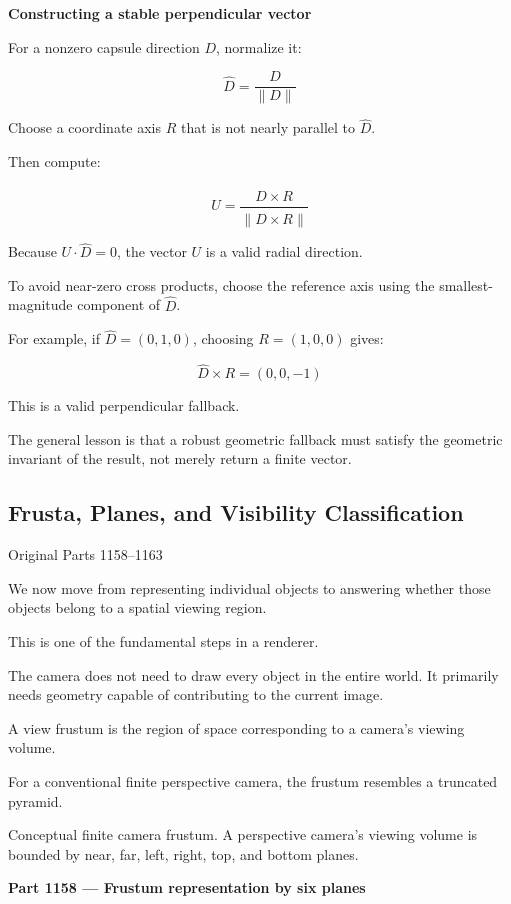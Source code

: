 \textbf{Constructing a stable perpendicular vector}

For a nonzero capsule direction \(D\), normalize it:

\[
\hat D=\frac{D}{\|D\|}
\]

Choose a coordinate axis \(R\) that is not nearly parallel to \(\hat D\).

Then compute:

\[
U=\frac{\hat D\times R}{\|\hat D\times R\|}
\]

Because \(U\cdot\hat D=0\), the vector \(U\) is a valid radial direction.

To avoid near-zero cross products, choose the reference axis using the smallest-magnitude component of \(\hat D\).

For example, if \(\hat D=(0,1,0)\), choosing \(R=(1,0,0)\) gives:

\[
\hat D\times R=(0,0,-1)
\]

This is a valid perpendicular fallback.

The general lesson is that a robust geometric fallback must satisfy the geometric invariant of the result, not merely return a finite vector.

\subsection{Frusta, Planes, and Visibility Classification}\label{03-visual-computing-i-ch021-frusta-planes-and-visibility-classification}

Original Parts 1158--1163

We now move from representing individual objects to answering whether those objects belong to a spatial viewing region.

This is one of the fundamental steps in a renderer.

The camera does not need to draw every object in the entire world. It primarily needs geometry capable of contributing to the current image.

A view frustum is the region of space corresponding to a camera's viewing volume.

For a conventional finite perspective camera, the frustum resembles a truncated pyramid.

Conceptual finite camera frustum. A perspective camera's viewing volume is bounded by near, far, left, right, top, and bottom planes.

\textbf{Part 1158 --- Frustum representation by six planes}

